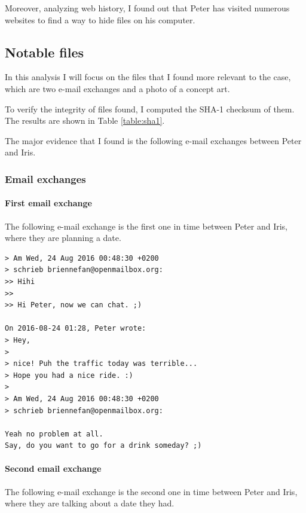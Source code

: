 \documentclass[12pt]{article}
\begin{document}
Moreover, analyzing web history, I found out that Peter has visited numerous websites to find a way to hide files on his computer. 

\subsection{Notable files}

In this analysis I will focus on the files that I found more relevant to the case, which are two e-mail exchanges and a photo of a concept art.

To verify the integrity of files found, I computed the SHA-1 checksum of them. The results are shown in Table \ref{table:sha1}.

The major evidence that I found is the following e-mail exchanges between Peter and Iris.

\subsubsection{Email exchanges}

\paragraph{First email exchange}
\label{sec:first-mail}

The following e-mail exchange is the first one in time between Peter and Iris, where they are planning a date.

\begin{shaded}
\begin{verbatim}
> Am Wed, 24 Aug 2016 00:48:30 +0200
> schrieb briennefan@openmailbox.org:
>> Hihi
>> 
>> Hi Peter, now we can chat. ;)

On 2016-08-24 01:28, Peter wrote:
> Hey,
> 
> nice! Puh the traffic today was terrible...
> Hope you had a nice ride. :)
> 
> Am Wed, 24 Aug 2016 00:48:30 +0200
> schrieb briennefan@openmailbox.org:

Yeah no problem at all.
Say, do you want to go for a drink someday? ;)
\end{verbatim}
\end{shaded}

\paragraph{Second email exchange}
The following e-mail exchange is the second one in time between Peter and Iris, where they are talking about a date they had.
\end{document}
